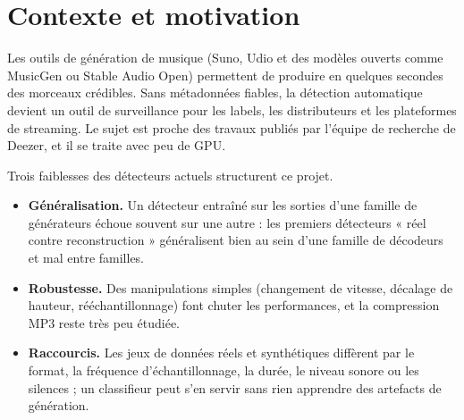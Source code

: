 \documentclass[11pt,a4paper]{article}
\begin{document}
\begin{abstract}
\noindent Les détecteurs de musique générée par IA obtiennent des scores quasi parfaits sur les sorties brutes de générateurs connus. On connaît beaucoup moins bien leur comportement face à un générateur jamais vu, face à un changement de vitesse ou à une compression MP3, et la part de leur précision qui provient de raccourcis de jeu de données (format, fréquence d'échantillonnage, bande passante, durée, volume) plutôt que d'artefacts de génération.
Ce projet, de nature \emph{réplication-extension}, entraîne des détecteurs réel/faux dont les « faux » sont fabriqués \emph{sans générateur de musique} : de la musique réelle (FMA) est ré-encodée par des codecs neuronaux (EnCodec, DAC). Ces détecteurs sont ensuite testés sur FakeMusicCaps (cinq modèles texte-musique ouverts) et sous attaques (vitesse, hauteur, MP3, rééchantillonnage). Le protocole impose une chaîne de normalisation commune, un détecteur de métadonnées seul comme contrôle négatif, des splits sans fuite et quatre hypothèses datées et réfutables, écrites avant tout entraînement.
Le projet est calibré pour quatre semaines et un budget de calcul modeste, et s'accompagne d'un plan de formation à l'audio pour un étudiant sans cours de traitement du signal (annexe~\ref{app:formation}).
\end{abstract}

\tableofcontents
\newpage

\section{Contexte et motivation}
\label{sec:contexte}

Les outils de génération de musique (Suno, Udio et des modèles ouverts comme MusicGen ou Stable Audio Open) permettent de produire en quelques secondes des morceaux crédibles. Sans métadonnées fiables, la détection automatique devient un outil de surveillance pour les labels, les distributeurs et les plateformes de streaming. Le sujet est proche des travaux publiés par l'équipe de recherche de Deezer, et il se traite avec peu de GPU.

Trois faiblesses des détecteurs actuels structurent ce projet.
\begin{itemize}
  \item \textbf{Généralisation.} Un détecteur entraîné sur les sorties d'une famille de générateurs échoue souvent sur une autre : les premiers détecteurs « réel contre reconstruction » généralisent bien au sein d'une famille de décodeurs et mal entre familles.
  \item \textbf{Robustesse.} Des manipulations simples (changement de vitesse, décalage de hauteur, rééchantillonnage) font chuter les performances, et la compression MP3 reste très peu étudiée.
  \item \textbf{Raccourcis.} Les jeux de données réels et synthétiques diffèrent par le format, la fréquence d'échantillonnage, la durée, le niveau sonore ou les silences ; un classifieur peut s'en servir sans rien apprendre des artefacts de génération.
\end{itemize}
\end{document}
